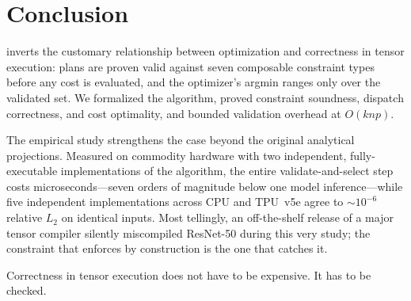 \section{Conclusion}
\label{sec:conclusion}

\gate{} inverts the customary relationship between optimization and
correctness in tensor execution: plans are proven valid against seven
composable constraint types before any cost is evaluated, and the
optimizer's argmin ranges only over the validated set. We formalized
the algorithm, proved constraint soundness, dispatch correctness, and
cost optimality, and bounded validation overhead at $O(knp)$.

The empirical study strengthens the case beyond the original analytical
projections. Measured on commodity hardware with two independent,
fully-executable implementations of the algorithm, the entire
validate-and-select step costs microseconds---seven orders of magnitude
below one model inference---while five independent implementations
across CPU and TPU~v5e agree to ${\sim}10^{-6}$ relative $L_2$ on
identical inputs. Most tellingly, an off-the-shelf release of a major
tensor compiler silently miscompiled ResNet-50 during this very study;
the constraint that \gate{} enforces by construction is the one that
catches it.

Correctness in tensor execution does not have to be expensive. It has
to be checked.
